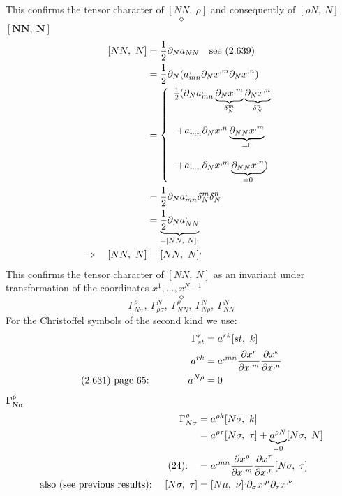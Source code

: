This confirms the tensor character of $[ NN, \ \rho ] $ and consequently of $[\rho N, \ N ]$
$$\diamond$$
\newpage
$\boldsymbol{[NN, \ N ] }$\\
\begin{align}
\ [ NN, \ N ] &= \frac{1}{2} \partial_{N} a_{NN}\quad \text{see (2.639)}\\
\ &= \frac{1}{2} \partial_{N} (a^{,}_{mn}\partial_{N}x^{,m}\partial_{N}x^{,n})\\
\ & = \left\{ \begin{array}{l}
\frac{1}{2} (\partial_{N} a^{,}_{mn}\underbrace{\partial_{N}x^{,m}}_{\delta^m_N}\underbrace{\partial_{N}x^{,n}}_{\delta^n_N}\\\\
\ + a^{,}_{mn} \partial_{N}x^{,n} \underbrace{\partial_{N N}x^{,m}}_{=0}\\\\
\ + a^{,}_{mn} \partial_{N}x^{,m} \underbrace{\partial_{N N}x^{,n}}_{=0})
\end{array} \right.\\
\ &= \frac{1}{2} \partial_{N} a^{,}_{mn}\delta^m_N\delta^n_N\\
\ &=  \underbrace{\frac{1}{2} \partial_{N} a^{,}_{NN}}_{=[ NN, \ N ]^,} \\
\Rightarrow \quad [ NN, \ N ] &=  [ NN, \ N ]^,
\end{align}
This confirms the tensor character of $[ NN, \ N ] $ as an invariant under transformation of the coordinates $x^1, \dots , x^{N-1}$
$$\diamond$$
$$\Gamma^{\rho}_{N \sigma},\ \Gamma^{N}_{\rho \sigma},\ \Gamma^{\rho}_{N N}, \ \Gamma^{N}_{N \rho}, \ \Gamma^{N}_{N N}$$
For the Christoffel symbols of the second kind we use:
\begin{align}
\Gamma^r_{st} &= a^{rk}[st,\ k]\\
\ a^{rk} &= a^{,mn}\pdv{x^r}{x^{,m}}\pdv{x^k}{x^{,n}}\\
 \text{(2.631) page 65:}\quad\quad\quad\quad a^{N \rho} &= 0 
\end{align}
\newpage
$\boldsymbol{\Gamma^{\rho}_{N \sigma}}$\\
\begin{align}
\Gamma^{\rho}_{N \sigma} &= a^{\rho k}[N \sigma,\ k]\\
\ & = a^{\rho \tau}[N \sigma,\ \tau]+ \underbrace{a^{\rho N}}_{=0}[N \sigma,\ N]\\
\text{(24):}\quad &= a^{,mn}\pdv{x^{\rho}}{x^{,m}}\pdv{x^{\tau}}{x^{,n}}[N \sigma,\ \tau]\\
\text{also (see previous results):}\quad \ [N \sigma,\ \tau] &= [ N \mu, \ \nu]^{,}\partial_{\sigma}x^{,\mu}\partial_{\tau}x^{,\nu}
\end{align}

